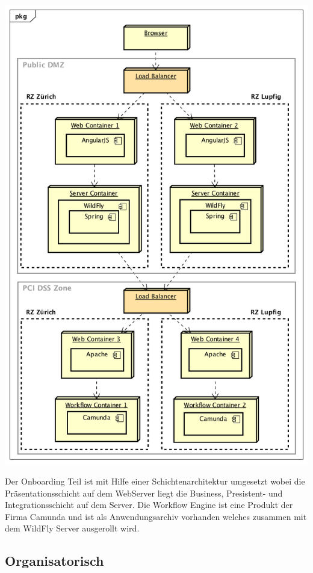 \begin{center}
	\includegraphics[scale=0.6]{CurrentDeployment.png}
\end{center}
Der Onboarding Teil ist mit Hilfe einer Schichtenarchitektur umgesetzt wobei die Präsentationsschicht auf dem WebServer liegt die Business, Presistent- und Integrationsschicht auf dem Server. Die Workflow Engine ist eine Produkt der Firma Camunda und ist als Anwendungsarchiv vorhanden welches zusammen mit dem WildFly Server ausgerollt wird.

\subsection{Organisatorisch}

